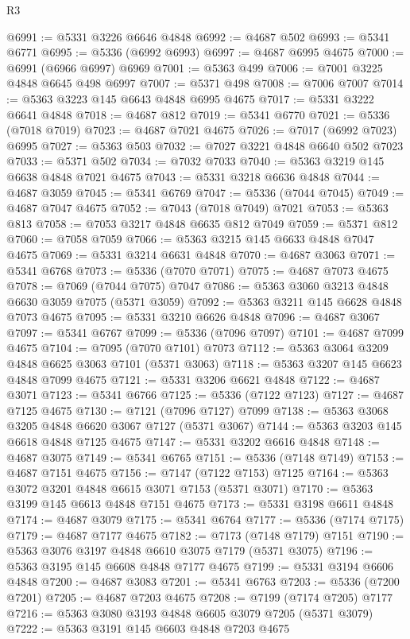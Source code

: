 \begin{lexlean}{R3}
\begin{coremodule}
@6991 := @5331 @3226 @6646 @4848
@6992 := @4687 @502
@6993 := @5341 @6771
@6995 := @5336 (@6992 @6993)
@6997 := @4687 @6995 @4675
@7000 := @6991 (@6966 @6997) @6969
@7001 := @5363 @499
@7006 := @7001 @3225 @4848 @6645 @498 @6997
@7007 := @5371 @498
@7008 := @7006 @7007
@7014 := @5363 @3223 @145 @6643 @4848 @6995 @4675
@7017 := @5331 @3222 @6641 @4848
@7018 := @4687 @812
@7019 := @5341 @6770
@7021 := @5336 (@7018 @7019)
@7023 := @4687 @7021 @4675
@7026 := @7017 (@6992 @7023) @6995
@7027 := @5363 @503
@7032 := @7027 @3221 @4848 @6640 @502 @7023
@7033 := @5371 @502
@7034 := @7032 @7033
@7040 := @5363 @3219 @145 @6638 @4848 @7021 @4675
@7043 := @5331 @3218 @6636 @4848
@7044 := @4687 @3059
@7045 := @5341 @6769
@7047 := @5336 (@7044 @7045)
@7049 := @4687 @7047 @4675
@7052 := @7043 (@7018 @7049) @7021
@7053 := @5363 @813
@7058 := @7053 @3217 @4848 @6635 @812 @7049
@7059 := @5371 @812
@7060 := @7058 @7059
@7066 := @5363 @3215 @145 @6633 @4848 @7047 @4675
@7069 := @5331 @3214 @6631 @4848
@7070 := @4687 @3063
@7071 := @5341 @6768
@7073 := @5336 (@7070 @7071)
@7075 := @4687 @7073 @4675
@7078 := @7069 (@7044 @7075) @7047
@7086 := @5363 @3060 @3213 @4848 @6630 @3059 @7075 (@5371 @3059)
@7092 := @5363 @3211 @145 @6628 @4848 @7073 @4675
@7095 := @5331 @3210 @6626 @4848
@7096 := @4687 @3067
@7097 := @5341 @6767
@7099 := @5336 (@7096 @7097)
@7101 := @4687 @7099 @4675
@7104 := @7095 (@7070 @7101) @7073
@7112 := @5363 @3064 @3209 @4848 @6625 @3063 @7101 (@5371 @3063)
@7118 := @5363 @3207 @145 @6623 @4848 @7099 @4675
@7121 := @5331 @3206 @6621 @4848
@7122 := @4687 @3071
@7123 := @5341 @6766
@7125 := @5336 (@7122 @7123)
@7127 := @4687 @7125 @4675
@7130 := @7121 (@7096 @7127) @7099
@7138 := @5363 @3068 @3205 @4848 @6620 @3067 @7127 (@5371 @3067)
@7144 := @5363 @3203 @145 @6618 @4848 @7125 @4675
@7147 := @5331 @3202 @6616 @4848
@7148 := @4687 @3075
@7149 := @5341 @6765
@7151 := @5336 (@7148 @7149)
@7153 := @4687 @7151 @4675
@7156 := @7147 (@7122 @7153) @7125
@7164 := @5363 @3072 @3201 @4848 @6615 @3071 @7153 (@5371 @3071)
@7170 := @5363 @3199 @145 @6613 @4848 @7151 @4675
@7173 := @5331 @3198 @6611 @4848
@7174 := @4687 @3079
@7175 := @5341 @6764
@7177 := @5336 (@7174 @7175)
@7179 := @4687 @7177 @4675
@7182 := @7173 (@7148 @7179) @7151
@7190 := @5363 @3076 @3197 @4848 @6610 @3075 @7179 (@5371 @3075)
@7196 := @5363 @3195 @145 @6608 @4848 @7177 @4675
@7199 := @5331 @3194 @6606 @4848
@7200 := @4687 @3083
@7201 := @5341 @6763
@7203 := @5336 (@7200 @7201)
@7205 := @4687 @7203 @4675
@7208 := @7199 (@7174 @7205) @7177
@7216 := @5363 @3080 @3193 @4848 @6605 @3079 @7205 (@5371 @3079)
@7222 := @5363 @3191 @145 @6603 @4848 @7203 @4675

\end{coremodule}
\end{lexlean}
